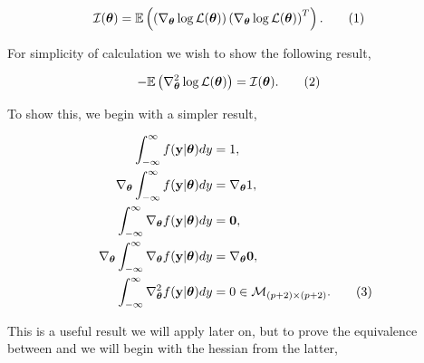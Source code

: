 \documentclass[honours,12pt]{unswthesis}
\newcommand{\E}{\mathbb{E}}
\newcommand{\ta}{\bm{\theta}}
\newcommand{\LL}{\log{\mathcal{L}}}
\newcommand{\y}{\mathbf{y}}
\newcommand\numberthis{\addtocounter{equation}{1}\tag{\theequation}}
\numberwithin{equation}{section}
\begin{document}
\begin{align*}
	\mathcal{I}(\ta) &= \E \left( \left( \nabla_{\ta} \LL (\ta) \right) \left( \nabla_{\ta} \LL (\ta) \right)^{T} \right). \numberthis \label{fisherinformation:definition}
\end{align*}

\noindent For simplicity of calculation we wish to show the following result,

\begin{align*}
	-\E \left( \nabla_{\ta}^{2} \LL (\ta) \right) &= \mathcal{I}(\ta). \numberthis \label{fisherinformation:alt}
\end{align*}

\noindent To show this, we begin with a simpler result,

\begin{align*}
	\int_{-\infty}^{\infty} f(\y | \ta) dy &= 1,\\
	\nabla_{\ta} \int_{-\infty}^{\infty} f(\y | \ta) dy &=  \nabla_{\ta}1,\\
	\int_{-\infty}^{\infty} \nabla_{\ta} f(\y | \ta) dy &=  \mathbf{0},\\
	\nabla_{\ta} \int_{-\infty}^{\infty} \nabla_{\ta} f(\y | \ta) dy &=  \nabla_{\ta} \mathbf{0},\\
	\int_{-\infty}^{\infty} \nabla_{\ta}^{2} f(\y | \ta) dy &=  0 \in \mathcal{M}_{\left(p+2\right) \times \left(p+2\right)}. \numberthis \label{useful1}
\end{align*}

\noindent This is a useful result we will apply later on, but to prove the equivalence between  and  we will begin with the hessian from the latter,
\end{document}

